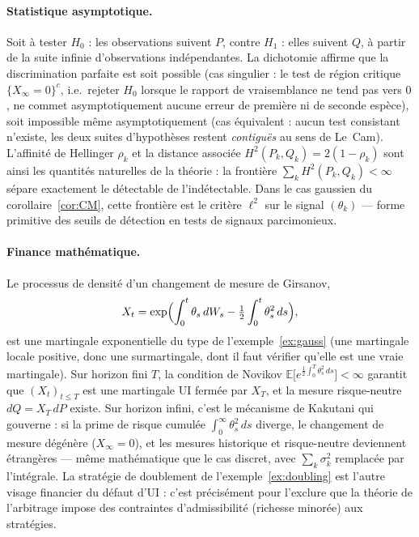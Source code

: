 \documentclass[11pt,a4paper]{article}
\theoremstyle{plain}
\theoremstyle{definition}
\theoremstyle{remark}
\newcommand{\E}{\mathbb{E}}
\begin{document}
\paragraph{Statistique asymptotique.}
Soit à tester $H_0$ : les observations suivent $P$, contre $H_1$ : elles
suivent $Q$, à partir de la suite infinie d'observations indépendantes. La
dichotomie affirme que la discrimination parfaite est soit possible (cas
singulier : le test de région critique $\{X_\infty = 0\}^c$, i.e.\ rejeter
$H_0$ lorsque le rapport de vraisemblance ne tend pas vers $0$, ne commet
asymptotiquement aucune erreur de première ni de seconde espèce), soit
impossible même asymptotiquement (cas équivalent : aucun test consistant
n'existe, les deux suites d'hypothèses restent \emph{contiguës} au sens de
Le~Cam). L'affinité de Hellinger $\rho_k$ et la distance associée
$H^2(P_k, Q_k) = 2(1 - \rho_k)$ sont ainsi les quantités naturelles de la
théorie : la frontière $\sum_k H^2(P_k, Q_k) < \infty$ sépare exactement le
détectable de l'indétectable. Dans le cas gaussien du
corollaire~\ref{cor:CM}, cette frontière est le critère $\ell^2$ sur le signal
$(\theta_k)$ --- forme primitive des seuils de détection en tests de signaux
parcimonieux.

\paragraph{Finance mathématique.}
Le processus de densité d'un changement de mesure de Girsanov,
\[
X_t = \exp\Bigl(\int_0^t \theta_s\, dW_s - \tfrac12 \int_0^t \theta_s^2\,
ds\Bigr),
\]
est une martingale exponentielle du type de l'exemple~\ref{ex:gauss} (une
martingale locale positive, donc une surmartingale, dont il faut vérifier
qu'elle est une vraie martingale). Sur horizon fini $T$, la condition de
Novikov $\E\bigl[e^{\frac12\int_0^T \theta_s^2\, ds}\bigr] < \infty$ garantit
que $(X_t)_{t \le T}$ est une martingale UI fermée par $X_T$, et la mesure
risque-neutre $dQ = X_T\, dP$ existe. Sur horizon infini, c'est le mécanisme de
Kakutani qui gouverne : si la prime de risque cumulée
$\int_0^\infty \theta_s^2\, ds$ diverge, le changement de mesure dégénère
($X_\infty = 0$), et les mesures historique et risque-neutre deviennent
étrangères --- même mathématique que le cas discret, avec $\sum_k \sigma_k^2$
remplacée par l'intégrale. La stratégie de doublement de
l'exemple~\ref{ex:doubling} est l'autre visage financier du défaut d'UI :
c'est précisément pour l'exclure que la théorie de l'arbitrage impose des
contraintes d'admissibilité (richesse minorée) aux stratégies.
\end{document}
